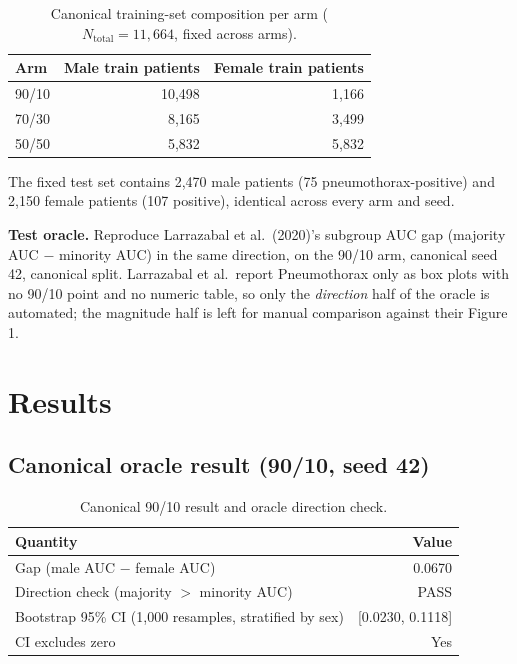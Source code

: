 \documentclass[11pt]{article}
\begin{document}
\begin{table}[H]
\centering
\begin{tabular}{lrr}
\toprule
Arm & Male train patients & Female train patients \\
\midrule
90/10 & 10{,}498 & 1{,}166 \\
70/30 & 8{,}165 & 3{,}499 \\
50/50 & 5{,}832 & 5{,}832 \\
\bottomrule
\end{tabular}
\caption{Canonical training-set composition per arm ($N_{\text{total}}=11{,}664$, fixed across arms).}
\label{tab:composition}
\end{table}

The fixed test set contains 2{,}470 male patients (75 pneumothorax-positive) and 2{,}150 female patients (107 positive), identical across every arm and seed.

\textbf{Test oracle.} Reproduce Larrazabal et al.\ (2020)'s subgroup AUC gap (majority AUC $-$ minority AUC) in the same direction, on the 90/10 arm, canonical seed 42, canonical split. Larrazabal et al.\ report Pneumothorax only as box plots with no 90/10 point and no numeric table, so only the \emph{direction} half of the oracle is automated; the magnitude half is left for manual comparison against their Figure 1.

\section{Results}

\subsection{Canonical oracle result (90/10, seed 42)}

\begin{table}[H]
\centering
\begin{tabular}{lr}
\toprule
Quantity & Value \\
\midrule
Gap (male AUC $-$ female AUC) & 0.0670 \\
Direction check (majority $>$ minority AUC) & PASS \\
Bootstrap 95\% CI (1{,}000 resamples, stratified by sex) & [0.0230, 0.1118] \\
CI excludes zero & Yes \\
\bottomrule
\end{tabular}
\caption{Canonical 90/10 result and oracle direction check.}
\label{tab:canonical}
\end{table}
\end{document}
